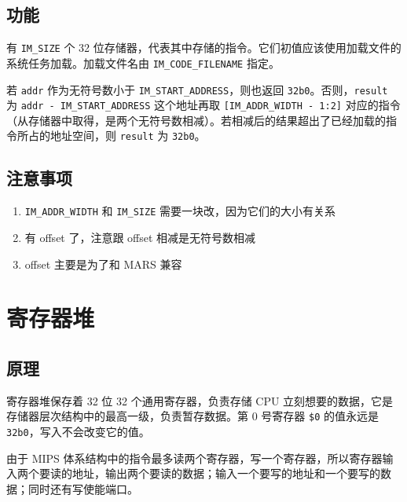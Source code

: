\documentclass[12pt,AutoFakeBold,AutoFakeSlant]{article}
\providecommand{\tightlist}{%
  \setlength{\itemsep}{0pt}\setlength{\parskip}{0pt}}
\begin{document}
\hypertarget{ux529fux80fd-2}{%
\subsection{功能}\label{ux529fux80fd-2}}

有 \texttt{IM\_SIZE} 个 32
位存储器，代表其中存储的指令。它们初值应该使用加载文件的系统任务加载。加载文件名由
\texttt{IM\_CODE\_FILENAME} 指定。

若 \texttt{addr} 作为无符号数小于 \texttt{IM\_START\_ADDRESS}，则也返回
\texttt{32\textquotesingle{}b0}。否则，\texttt{result} 为
\texttt{addr\ -\ IM\_START\_ADDRESS} 这个地址再取
\texttt{{[}IM\_ADDR\_WIDTH\ -\ 1:2{]}}
对应的指令（从存储器中取得，是两个无符号数相减）。若相减后的结果超出了已经加载的指令所占的地址空间，则
\texttt{result} 为 \texttt{32\textquotesingle{}b0}。

\hypertarget{ux6ce8ux610fux4e8bux9879-2}{%
\subsection{注意事项}\label{ux6ce8ux610fux4e8bux9879-2}}

\begin{enumerate}
\def\labelenumi{\arabic{enumi}.}
\tightlist
\item
  \texttt{IM\_ADDR\_WIDTH} 和 \texttt{IM\_SIZE}
  需要一块改，因为它们的大小有关系
\item
  有 offset 了，注意跟 offset 相减是无符号数相减
\item
  offset 主要是为了和 MARS 兼容
\end{enumerate}

\hypertarget{ux5bc4ux5b58ux5668ux5806}{%
\section{寄存器堆}\label{ux5bc4ux5b58ux5668ux5806}}

\hypertarget{ux539fux7406-3}{%
\subsection{原理}\label{ux539fux7406-3}}

寄存器堆保存着 32 位 32 个通用寄存器，负责存储 CPU
立刻想要的数据，它是存储器层次结构中的最高一级，负责暂存数据。第 0
号寄存器 \texttt{\$0} 的值永远是
\texttt{32\textquotesingle{}b0}，写入不会改变它的值。

由于 MIPS
体系结构中的指令最多读两个寄存器，写一个寄存器，所以寄存器输入两个要读的地址，输出两个要读的数据；输入一个要写的地址和一个要写的数据；同时还有写使能端口。
\end{document}
